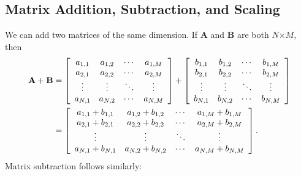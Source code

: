 \subsection{Matrix Addition, Subtraction, and Scaling}

We can add two matrices of the same dimension. If $\mathbf{A}$ and $\mathbf{B}$ are both $N$$\times$$M$, then
\begin{align}
  \mathbf{A} + \mathbf{B} &= 
    \left[ \begin{array}{c c c c} a_{1,1} & a_{1,2} & \cdots & a_{1,M} \\
  		  						  a_{2,1} & a_{2,2} & \cdots & a_{2,M} \\
		  						  \vdots  & \vdots  & \ddots & \vdots  \\
								  a_{N,1} & a_{N,2} & \cdots & a_{N,M} \\ \end{array} \right]
  +	\left[ \begin{array}{c c c c} b_{1,1} & b_{1,2} & \cdots & b_{1,M} \\
  		  						  b_{2,1} & b_{2,2} & \cdots & b_{2,M} \\
		  						  \vdots  & \vdots  & \ddots & \vdots  \\
								  b_{N,1} & b_{N,2} & \cdots & b_{N,M} \\ \end{array} \right] \nonumber	\\		
  &= \left[ \begin{array}{c c c c} a_{1,1} + b_{1,1} & a_{1,2} + b_{1,2} & \cdots & a_{1,M} + b_{1,M} \\
  		  						   a_{2,1} + b_{2,1} & a_{2,2} + b_{2,2} & \cdots & a_{2,M} + b_{2,M} \\
		  						   \vdots  & \vdots  & \ddots & \vdots  \\
								   a_{N,1} + b_{N,1} & a_{N,2} + b_{N,2} & \cdots & a_{N,M} + b_{N,M} \\ \end{array} \right] .
\end{align}
Matrix subtraction follows similarly:
